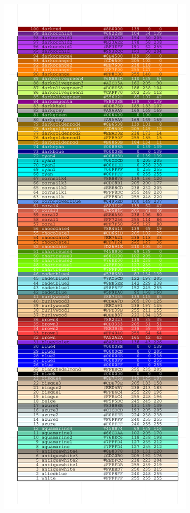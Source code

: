 \documentclass[letterpaper]{article}
\begin{document}
\begin{center}
\begin{figure}[ht]
\begin{minipage}[b]{0.5\linewidth}
\includegraphics{ggplotCheatSheet-005}
\end{minipage}

\end{figure}
\end{center}
\end{document}
